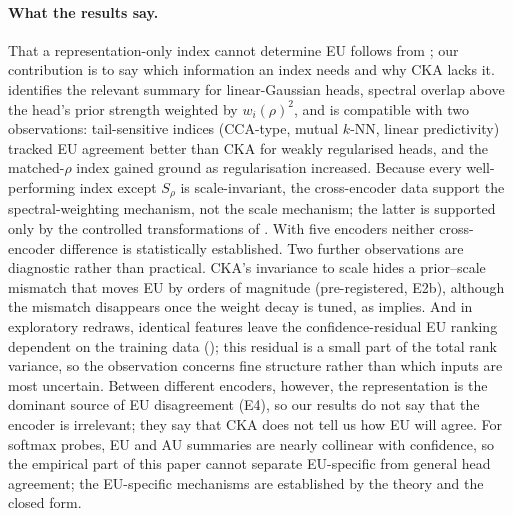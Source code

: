 \documentclass[twoside]{article}
\theoremstyle{definition}
\theoremstyle{remark}
\newcommand{\Srho}{S_{\rho}}
\begin{document}
\paragraph{What the results say.}
That a representation-only index cannot determine EU follows from ; our contribution is to say which information an index needs and why CKA lacks it.
 identifies the relevant summary for linear-Gaussian heads, spectral overlap above the head's prior strength weighted by $w_i(\rho)^2$, and is compatible with two observations: tail-sensitive indices (CCA-type, mutual $k$-NN, linear predictivity) tracked EU agreement better than CKA for weakly regularised heads, and the matched-$\rho$ index gained ground as regularisation increased.
Because every well-performing index except $\Srho$ is scale-invariant, the cross-encoder data support the spectral-weighting mechanism, not the scale mechanism; the latter is supported only by the controlled transformations of .
With five encoders neither cross-encoder difference is statistically established.
Two further observations are diagnostic rather than practical. CKA's invariance to scale hides a prior--scale mismatch that moves EU by orders of magnitude (pre-registered, E2b), although the mismatch disappears once the weight decay is tuned, as  implies. And in exploratory redraws, identical features leave the confidence-residual EU ranking dependent on the training data (); this residual is a small part of the total rank variance, so the observation concerns fine structure rather than which inputs are most uncertain.
Between different encoders, however, the representation is the dominant source of EU disagreement (E4), so our results do not say that the encoder is irrelevant; they say that CKA does not tell us how EU will agree.
For softmax probes, EU and AU summaries are nearly collinear with confidence, so the empirical part of this paper cannot separate EU-specific from general head agreement; the EU-specific mechanisms are established by the theory and the closed form.
\end{document}
